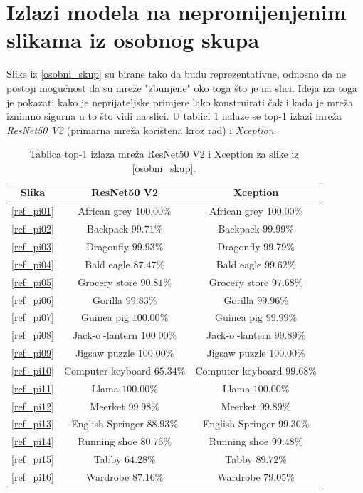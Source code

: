 \documentclass[utf8, diplomski]{fer}
\begin{document}
\section{Izlazi modela na nepromijenjenim slikama iz osobnog skupa}
Slike iz \ref{osobni_skup} su birane tako da budu reprezentativne, odnosno da ne postoji mogućnost da su mreže "zbunjene" oko toga što je na slici. Ideja iza toga je pokazati kako je neprijateljske primjere lako konstruirati čak i kada je mreža iznimno sigurna u to što vidi na slici. U tablici \ref{regular_predictions} nalaze se top-1 izlazi mreža \textit{ResNet50 V2} (primarna mreža korištena kroz rad) i \textit{Xception}.
\\
\bgroup
\def\arraystretch{1.2}
\begin{table}[H]
\begin{tabular}{|c | c | c|}
\hline
Slika & ResNet50 V2 & Xception \\ \hline
\ref{ref_pi01} & African grey $100.00\%$ & African grey $100.00\%$  \\ \hline
\ref{ref_pi02} & Backpack $99.71\%$ & Backpack $99.99\%$ \\ \hline
\ref{ref_pi03} & Dragonfly $99.93\%$ & Dragonfly $99.79\%$ \\ \hline
\ref{ref_pi04} & Bald eagle $87.47\%$ & Bald eagle $99.62\%$ \\  \hline
\ref{ref_pi05} & Grocery store $90.81\%$ & Grocery store $97.68\%$ \\ \hline
\ref{ref_pi06} & Gorilla $99.83\%$ & Gorilla $99.96\%$ \\ \hline
\ref{ref_pi07} & Guinea pig $100.00\%$ & Guinea pig $99.99\%$ \\ \hline
\ref{ref_pi08} & Jack-o'-lantern $100.00\%$ & Jack-o'-lantern $99.89\%$ \\ \hline
\ref{ref_pi09} & Jigsaw puzzle $100.00\%$ & Jigsaw puzzle $100.00\%$ \\ \hline
\ref{ref_pi10} & Computer keyboard $65.34\%$ & Computer keyboard $99.68\%$ \\ \hline
\ref{ref_pi11} & Llama $100.00\%$ & Llama $100.00\%$ \\ \hline
\ref{ref_pi12} & Meerket $99.98\%$ & Meerket $99.89\%$ \\ \hline
\ref{ref_pi13} & English Springer $88.93\%$ & English Springer $99.30\%$ \\ \hline
\ref{ref_pi14} & Running shoe $80.76\%$ & Running shoe $99.48\%$ \\ \hline
\ref{ref_pi15} & Tabby $64.28\%$ & Tabby $89.72\%$ \\ \hline
\ref{ref_pi16} & Wardrobe $87.16\%$ & Wardrobe $79.05\%$ \\ \hline
\end{tabular}
\caption{Tablica top-1 izlaza mreža ResNet50 V2 i Xception za slike iz \ref{osobni_skup}.}\label{regular_predictions}
\end{table}
\egroup
\end{document}
